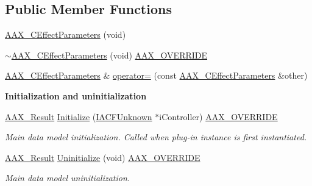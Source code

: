\subsection*{Public Member Functions}
\begin{DoxyCompactItemize}
\item 
\mbox{\hyperlink{a01481_a35be0a247836ce95e3c6d04a3d756a9f}{A\+A\+X\+\_\+\+C\+Effect\+Parameters}} (void)
\item 
\mbox{\hyperlink{a01481_aa291588613f55461932e9b696c91d2d3}{$\sim$\+A\+A\+X\+\_\+\+C\+Effect\+Parameters}} (void) \mbox{\hyperlink{a00392_ac2f24a5172689ae684344abdcce55463}{A\+A\+X\+\_\+\+O\+V\+E\+R\+R\+I\+DE}}
\item 
\mbox{\hyperlink{a01481}{A\+A\+X\+\_\+\+C\+Effect\+Parameters}} \& \mbox{\hyperlink{a01481_aea47eeb638da0d670fb92d3f1e0f9419}{operator=}} (const \mbox{\hyperlink{a01481}{A\+A\+X\+\_\+\+C\+Effect\+Parameters}} \&other)
\end{DoxyCompactItemize}
\begin{Indent}\textbf{ Initialization and uninitialization}\par
\begin{DoxyCompactItemize}
\item 
\mbox{\hyperlink{a00392_a4d8f69a697df7f70c3a8e9b8ee130d2f}{A\+A\+X\+\_\+\+Result}} \mbox{\hyperlink{a01481_a245f235300b04f1c8b4c83831d296e22}{Initialize}} (\mbox{\hyperlink{a01409}{I\+A\+C\+F\+Unknown}} $\ast$i\+Controller) \mbox{\hyperlink{a00392_ac2f24a5172689ae684344abdcce55463}{A\+A\+X\+\_\+\+O\+V\+E\+R\+R\+I\+DE}}
\begin{DoxyCompactList}\small\item\em Main data model initialization. Called when plug-\/in instance is first instantiated. \end{DoxyCompactList}\item 
\mbox{\hyperlink{a00392_a4d8f69a697df7f70c3a8e9b8ee130d2f}{A\+A\+X\+\_\+\+Result}} \mbox{\hyperlink{a01481_acd14ff2175a10759045674e8e14508b1}{Uninitialize}} (void) \mbox{\hyperlink{a00392_ac2f24a5172689ae684344abdcce55463}{A\+A\+X\+\_\+\+O\+V\+E\+R\+R\+I\+DE}}
\begin{DoxyCompactList}\small\item\em Main data model uninitialization. \end{DoxyCompactList}\end{DoxyCompactItemize}
\end{Indent}
